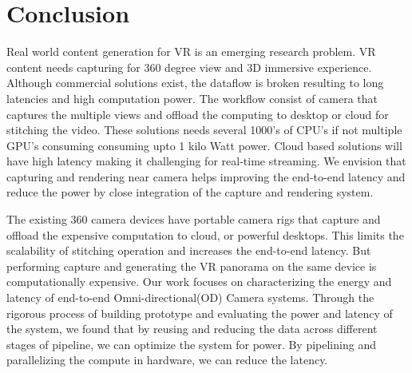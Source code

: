 \chapter{Conclusion}
Real world content generation for VR is an emerging research problem. VR content needs capturing for 360 degree view and 3D immersive experience. Although commercial solutions exist, the dataflow is broken resulting to long latencies and high computation power. The workflow consist of camera that captures the multiple views and offload the computing to desktop or cloud for stitching the video. These solutions needs several 1000's of CPU's if not multiple GPU's consuming consuming upto 1 kilo Watt power. Cloud based solutions will have high latency making it challenging for real-time streaming. We envision that capturing and rendering near camera helps improving the end-to-end latency and reduce the power by close integration of the capture and rendering system. 

The existing 360 camera devices have portable camera rigs that capture and offload the expensive computation to cloud, or powerful desktops. This limits the scalability of stitching operation  and increases the end-to-end latency. But performing capture and generating the VR panorama on the same device is computationally expensive. 	Our work focuses on characterizing the energy and latency of end-to-end Omni-directional(OD) Camera  systems. Through the rigorous process of building prototype and evaluating the power and latency of the system, we found that by reusing and reducing the data across different stages of pipeline, we can optimize the system for power. By pipelining and parallelizing the compute in hardware, we can reduce the latency.